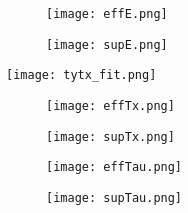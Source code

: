 \begin{figure}[ht]
		\centering
		\hspace*{\fill}
		\begin{subfigure}[b]{0.48\textwidth}
			\centering
			\texttt{[image: effE.png]}
			\caption{}\label{}
		\end{subfigure}
		\hfill
		\begin{subfigure}[b]{0.48\textwidth}
			\centering
			\texttt{[image: supE.png]}
			\caption{}\label{}
		\end{subfigure}
		\hspace*{\fill}
		\caption{}\label{}
\end{figure}

\begin{figure}[ht]
	\hspace*{\fill}
	\centering
	\texttt{[image: tytx\_fit.png]}
	\hspace*{\fill}
	\caption{}\label{}
\end{figure}

\begin{figure}[ht]
		\centering
		\hspace*{\fill}
		\begin{subfigure}[b]{0.48\textwidth}
			\centering
			\texttt{[image: effTx.png]}
			\caption{}\label{}
		\end{subfigure}
		\hfill
		\begin{subfigure}[b]{0.48\textwidth}
			\centering
			\texttt{[image: supTx.png]}
			\caption{}\label{}
		\end{subfigure}
		\hspace*{\fill}
		\caption{}\label{}
\end{figure}

\begin{figure}[ht]
		\centering
		\hspace*{\fill}
		\begin{subfigure}[b]{0.48\textwidth}
			\centering
			\texttt{[image: effTau.png]}
			\caption{}\label{}
		\end{subfigure}
		\hfill
		\begin{subfigure}[b]{0.48\textwidth}
			\centering
			\texttt{[image: supTau.png]}
			\caption{}\label{}
		\end{subfigure}
		\hspace*{\fill}
		\caption{}\label{}
\end{figure}





